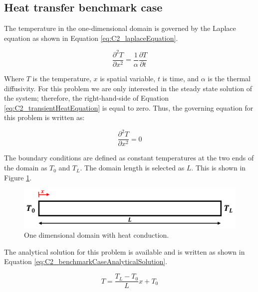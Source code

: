 \subsection{Heat transfer benchmark case}
The temperature in the one-dimensional domain is governed by the Laplace equation as shown in Equation \eqref{eq:C2_laplaceEquation}.

\begin{equation}\label{eq:C2_transientHeatEquation}
    \frac{\partial^2 T}{\partial x^2} = \frac{1}{\alpha} \frac{\partial T}{\partial t}
\end{equation}

Where $T$ is the temperature, $x$ is spatial variable, $t$ is time, and $\alpha$ is the thermal diffusivity. For this problem we are only interested in the steady state solution of the system; therefore, the right-hand-side of Equation \eqref{eq:C2_transientHeatEquation} is equal to zero. Thus, the governing equation for this problem is written as:

\begin{equation}\label{eq:C2_laplaceEquation}
    \frac{\partial^2 T}{\partial x^2} = 0
\end{equation}

The boundary conditions are defined as constant temperatures at the two ends of the domain as $T_0$ and $T_L$. The domain length is selected as $L$. This is shown in Figure \ref{fig:C2_benchmarkCase}.

\begin{figure}[h]
    \centering
    \includegraphics[width=14.00cm]{Chapter_2/figure/benchmark_case.png}
    \caption{One dimensional domain with heat conduction.}
    \label{fig:C2_benchmarkCase}
\end{figure}

The analytical solution for this problem is available and is written as shown in Equation \eqref{eq:C2_benchmarkCaseAnalyticalSolution}.

\begin{equation}\label{eq:C2_benchmarkCaseAnalyticalSolution}
    T = \frac{T_L - T_0}{L} x + T_0
\end{equation}

